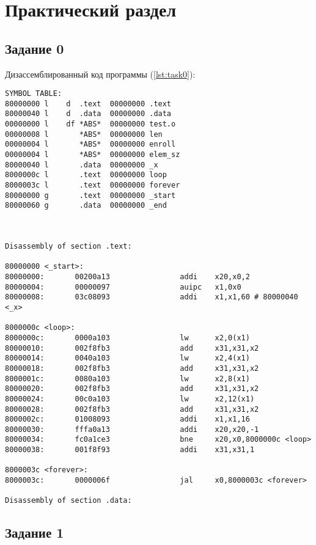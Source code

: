 \chapter{Практический раздел}

\section{Задание 0}

Дизассемблированный код программы (\ref{lst:task0}):

\begin{lstlisting}[style={asm}, caption=Программа для задания 0, label={lst:task0}]
SYMBOL TABLE:
80000000 l    d  .text  00000000 .text
80000040 l    d  .data  00000000 .data
00000000 l    df *ABS*  00000000 test.o
00000008 l       *ABS*  00000000 len
00000004 l       *ABS*  00000000 enroll
00000004 l       *ABS*  00000000 elem_sz
80000040 l       .data  00000000 _x
8000000c l       .text  00000000 loop
8000003c l       .text  00000000 forever
80000000 g       .text  00000000 _start
80000060 g       .data  00000000 _end



Disassembly of section .text:

80000000 <_start>:
80000000:       00200a13                addi    x20,x0,2
80000004:       00000097                auipc   x1,0x0
80000008:       03c08093                addi    x1,x1,60 # 80000040 <_x>

8000000c <loop>:
8000000c:       0000a103                lw      x2,0(x1)
80000010:       002f8fb3                add     x31,x31,x2
80000014:       0040a103                lw      x2,4(x1)
80000018:       002f8fb3                add     x31,x31,x2
8000001c:       0080a103                lw      x2,8(x1)
80000020:       002f8fb3                add     x31,x31,x2
80000024:       00c0a103                lw      x2,12(x1)
80000028:       002f8fb3                add     x31,x31,x2
8000002c:       01008093                addi    x1,x1,16
80000030:       fffa0a13                addi    x20,x20,-1
80000034:       fc0a1ce3                bne     x20,x0,8000000c <loop>
80000038:       001f8f93                addi    x31,x31,1

8000003c <forever>:
8000003c:       0000006f                jal     x0,8000003c <forever>

Disassembly of section .data:
\end{lstlisting}
\clearpage

\section{Задание 1}

